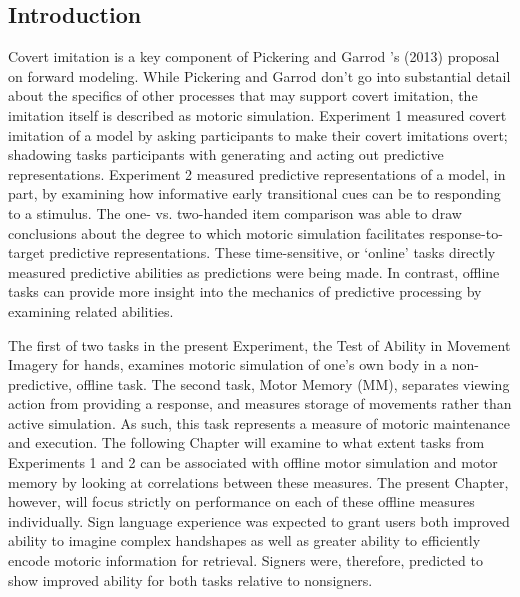     \subsection{Introduction} \label{sec:supp_intro}
            Covert imitation is a key component of Pickering and Garrod 's (2013) proposal on forward modeling. While Pickering and Garrod don't go into substantial detail about the specifics of other processes that may support covert imitation, the imitation itself is described as motoric simulation. Experiment 1 measured covert imitation of a model by asking participants to make their covert imitations overt; shadowing tasks participants with generating and acting out predictive representations. Experiment 2 measured predictive representations of a model, in part, by examining how informative early transitional cues can be to responding to a stimulus. The one- vs. two-handed item comparison was able to draw conclusions about the degree to which motoric simulation facilitates response-to-target predictive representations. These time-sensitive, or ‘online’ tasks directly measured predictive abilities as predictions were being made. In contrast, offline tasks can provide more insight into the mechanics of predictive processing by examining related abilities. \par 
            The first of two tasks in the present Experiment, the Test of Ability in Movement Imagery for hands, examines motoric simulation of one’s own body in a non-predictive, offline task. The second task, Motor Memory (MM), separates viewing action from providing a response, and measures storage of movements rather than active simulation. As such, this task represents a measure of motoric maintenance and execution. The following Chapter will examine to what extent tasks from Experiments 1 and 2 can be associated with offline motor simulation and motor memory by looking at correlations between these measures. The present Chapter, however, will focus strictly on performance on each of these offline measures individually.  Sign language experience was expected to grant users both improved ability to imagine complex handshapes as well as greater ability to efficiently encode motoric information for retrieval. Signers were, therefore, predicted to show improved ability for both tasks relative to nonsigners. 
